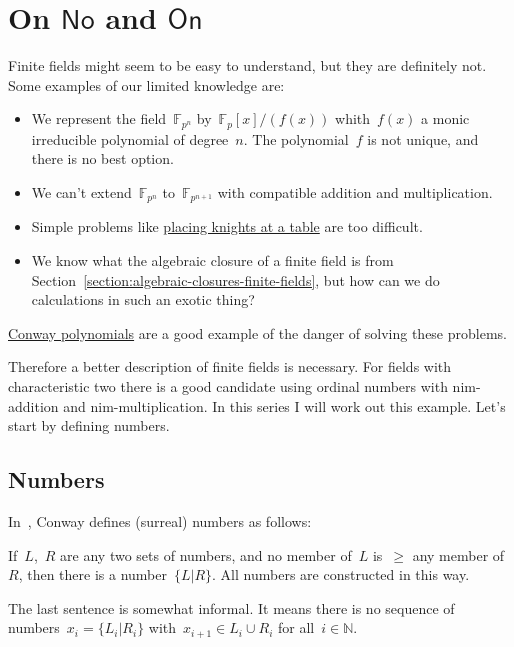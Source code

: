 \section{On \texorpdfstring{$\mathsf{No}$}{No} and \texorpdfstring{$\mathsf{On}$}{On}}
Finite fields might seem to be easy to understand, but they are definitely not. Some examples of our limited knowledge are:
\begin{itemize}
  \item We represent the field~$\mathbb{F}_{p^n}$ by~$\mathbb{F}_p[x]/(f(x))$ whith~$f(x)$ a monic irreducible polynomial of degree~$n$. The polynomial~$f$ is not unique, and there is no best option.
  \item We can't extend~$\mathbb{F}_{p^n}$ to~$\mathbb{F}_{p^{n+1}}$ with compatible addition and multiplication.
  \item Simple problems like \href{http://www.neverendingbooks.org/index.php/the-odd-knights-of-the-round-table.html}{placing knights at a table} are too difficult.
  \item We know what the algebraic closure of a finite field is from Section~\ref{section:algebraic-closures-finite-fields}, but how can we do calculations in such an exotic thing?
\end{itemize}
\href{http://en.wikipedia.org/wiki/Conway_polynomial_\%28finite_fields\%29}{Conway polynomials} are a good example of the danger of solving these problems.

Therefore a better description of finite fields is necessary. For fields with characteristic two there is a good candidate using ordinal numbers with nim-addition and nim-multiplication. In this series I will work out this example. Let's start by defining numbers.

\subsection{Numbers}
In~\cite{on-numbers-and-games}, Conway defines (surreal) numbers as follows:

\begin{definition}
  If~$L$,~$R$ are any two sets of numbers, and no member of~$L$ is~$\geq$ any member of~$R$, then there is a number~$\{L \vert R\}$. All numbers are constructed in this way.
\end{definition}

The last sentence is somewhat informal. It means there is no sequence of numbers~$x_i = \{L_i \vert R_i\}$ with~$x_{i+1} \in L_i \cup R_i$ for all~$i \in \mathbb{N}$.

